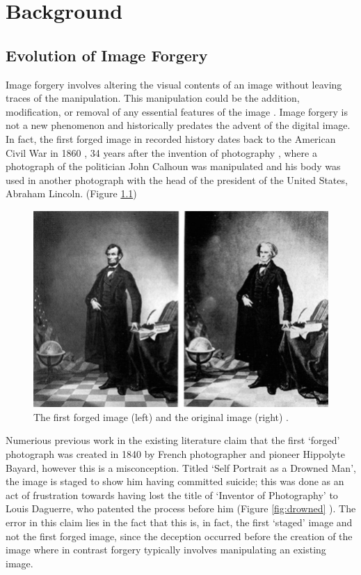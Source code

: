 \chapter{Background}\label{chap:background}

  \section{Evolution of Image Forgery} \label{sec:s1}
  
Image forgery involves altering the visual contents of an image without leaving traces of the manipulation. This manipulation could be the addition, modification, or removal of any essential features of the image \cite{MeenaTyagi2019}. Image forgery is not a new phenomenon and historically predates the advent of the digital image. In fact, the first forged image in recorded history dates back to the American Civil War in 1860 \cite{Sharma2018AnalysisOK}, 34 years after the invention of photography \cite{Gernsheim_1986}, where a photograph of the politician John Calhoun was manipulated and his body was used in another photograph with the head of the president of the United States, Abraham Lincoln. (Figure \ref{fig:lincon})

\begin{figure}[h!]
  \centering
  \includegraphics[width=0.5\linewidth]{figures/lincon212.png}
  \caption{The first forged image (left) and the original image (right) \cite{parveen2019}. }
  \label{fig:lincon}
\end{figure}

Numerious previous work in the existing literature \cite{mishra2013digital} \cite{Abdulqader2023} \cite{MeenaTyagi2019} \cite{nampoothiri2016digital} claim that the first `forged' photograph was created in 1840 by French photographer and pioneer Hippolyte Bayard, however this is a misconception. Titled `Self Portrait as a Drowned Man', the image is staged to show him having committed suicide; this was done as an act of frustration towards having lost the title of `Inventor of Photography' to Louis Daguerre, who patented the process before him (Figure \ref{fig:drowned} ). The error in this claim lies in the fact that this is, in fact, the first `staged' image and not the first forged image, since the deception occurred before the creation of the image where in contrast forgery typically involves manipulating an existing image. 

